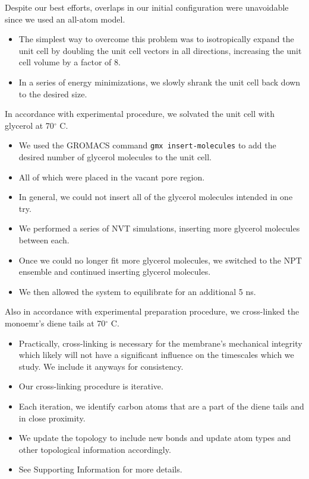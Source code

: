 \documentclass{article}
\begin{document}
  Despite our best efforts, overlaps in our initial configuration were unavoidable
  since we used an all-atom model. 
  \begin{itemize}
    \item The simplest way to overcome this problem was to isotropically expand 
    the unit cell by doubling the unit cell vectors in all directions, increasing the unit
    cell volume by a factor of 8. 
    \item In a series of energy minimizations, we slowly shrank the unit cell
    back down to the desired size.
  \end{itemize}
  
  In accordance with experimental procedure, we solvated the unit cell with glycerol at
  70$^{\circ}$ C.
  \begin{itemize}
    \item We used the GROMACS command \texttt{gmx insert-molecules} to add the desired
    number of glycerol molecules to the unit cell.
    \item All of which were placed in the vacant pore region.
    \item In general, we could not insert all of the glycerol molecules intended in one try. 
    \item We performed a series of NVT simulations, inserting more glycerol molecules between
    each.
    \item Once we could no longer fit more glycerol molecules, we switched to the NPT
    ensemble and continued inserting glycerol molecules.
    \item We then allowed the system to equilibrate for an additional 5 ns.
  \end{itemize}
  
  
  Also in accordance with experimental preparation procedure, we cross-linked the 
  monoemr's diene tails at 70$^{\circ}$ C. 
  \begin{itemize}
    \item Practically, cross-linking is necessary for the membrane's mechanical
    integrity which likely will not have a significant influence on the timescales
    which we study. We include it anyways for consistency.
    \item Our cross-linking procedure is iterative. 
    \item Each iteration, we identify carbon atoms that are a part of the diene 
    tails and in close proximity.
    \item We update the topology to include new bonds and update atom types and
    other topological information accordingly.
    \item See Supporting Information for more details.
  \end{itemize}
   
\end{document}
